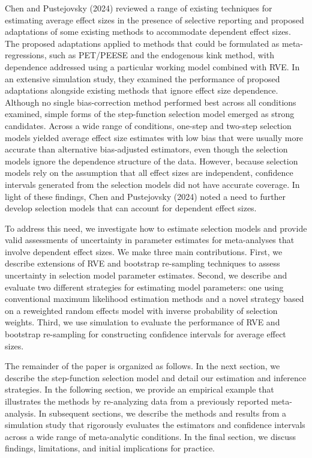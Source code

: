 \documentclass[
]{article}
\begin{document}
Chen and Pustejovsky (2024) reviewed a range of existing techniques for
estimating average effect sizes in the presence of selective reporting
and proposed adaptations of some existing methods to accommodate
dependent effect sizes. The proposed adaptations applied to methods that
could be formulated as meta-regressions, such as PET/PEESE and the
endogenous kink method, with dependence addressed using a particular
working model combined with RVE. In an extensive simulation study, they
examined the performance of proposed adaptations alongside existing
methods that ignore effect size dependence. Although no single
bias-correction method performed best across all conditions examined,
simple forms of the step-function selection model emerged as strong
candidates. Across a wide range of conditions, one-step and two-step
selection models yielded average effect size estimates with low bias
that were usually more accurate than alternative bias-adjusted
estimators, even though the selection models ignore the dependence
structure of the data. However, because selection models rely on the
assumption that all effect sizes are independent, confidence intervals
generated from the selection models did not have accurate coverage. In
light of these findings, Chen and Pustejovsky (2024) noted a need to
further develop selection models that can account for dependent effect
sizes.

To address this need, we investigate how to estimate selection models
and provide valid assessments of uncertainty in parameter estimates for
meta-analyses that involve dependent effect sizes. We make three main
contributions. First, we describe extensions of RVE and bootstrap
re-sampling techniques to assess uncertainty in selection model
parameter estimates. Second, we describe and evaluate two different
strategies for estimating model parameters: one using conventional
maximum likelihood estimation methods and a novel strategy based on a
reweighted random effects model with inverse probability of selection
weights. Third, we use simulation to evaluate the performance of RVE and
bootstrap re-sampling for constructing confidence intervals for average
effect sizes.

The remainder of the paper is organized as follows. In the next section,
we describe the step-function selection model and detail our estimation
and inference strategies. In the following section, we provide an
empirical example that illustrates the methods by re-analyzing data from
a previously reported meta-analysis. In subsequent sections, we describe
the methods and results from a simulation study that rigorously
evaluates the estimators and confidence intervals across a wide range of
meta-analytic conditions. In the final section, we discuss findings,
limitations, and initial implications for practice.
\end{document}
